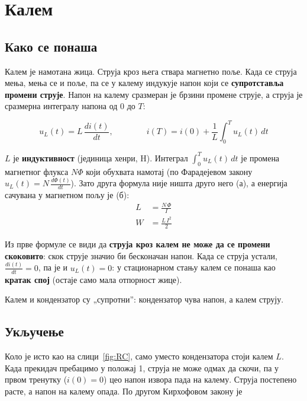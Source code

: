 \documentclass{article}
\begin{document}
\section{Калем}

\subsection{Како се понаша}

Калем је намотана жица. Струја кроз њега ствара магнетно поље. Када се
струја мења, мења се и поље, па се у калему индукује напон који се
\textbf{супротставља промени струје}. Напон на калему сразмеран је брзини
промене струје, а струја је сразмерна интегралу напона од $0$ до $T$:

\begin{kljucno}
\[
u_L(t) = L\,\frac{d i(t)}{dt},
\qquad\qquad
i(T) = i(0) + \frac{1}{L}\int_0^T u_L(t)\,dt
\]
\end{kljucno}

$L$ је \textbf{индуктивност} (јединица хенри, H). Интеграл
$\int_0^T u_L(t)\,dt$ је промена магнетног флукса $N\Phi$ који обухвата
намотај (по Фарадејевом закону $u_L(t) = N\,\frac{d\Phi(t)}{dt}$). Зато друга
формула није ништа друго него (а), а енергија сачувана у магнетном пољу је (б):
\begin{align}
    L &= \frac{N\,\Phi}{I} \tag{а} \\
    W &= \frac{L\,I^2}{2} \tag{б}
\end{align}

Из прве формуле се види да \textbf{струја кроз калем не може да се промени
скоковито}: скок струје значио би бесконачан напон. Када се струја устали,
$\frac{d i(t)}{dt} = 0$, па је и $u_L(t) = 0$: у стационарном стању калем се
понаша као \textbf{кратак спој} (остаје само мала отпорност жице).

Калем и кондензатор су „супротни”: кондензатор чува напон, а калем струју.

\subsection{Укључење}

Коло је исто као на слици~\ref{fig:RC}, само уместо кондензатора стоји калем
$L$. Када прекидач пребацимо у положај 1, струја не може одмах да скочи, па
у првом тренутку ($i(0) = 0$) цео напон извора пада на калему. Струја
постепено расте, а напон на калему опада. По другом Кирхофовом закону је
\end{document}
